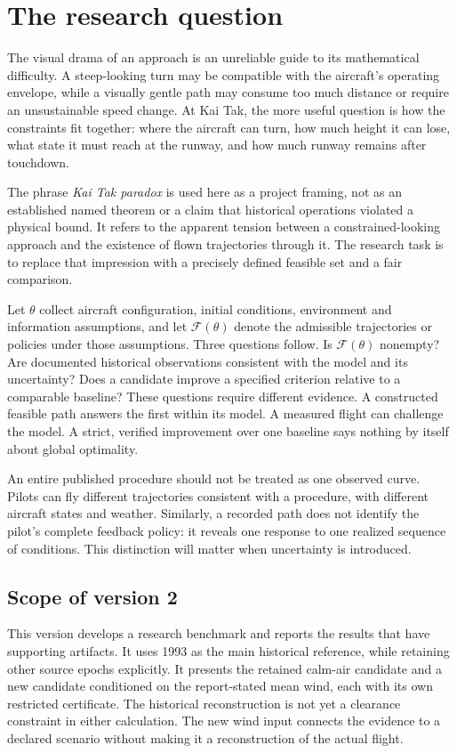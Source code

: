 \section{The research question}
\label{sec:question}
The visual drama of an approach is an unreliable guide to its mathematical difficulty. A steep-looking turn may be compatible with the aircraft's operating envelope, while a visually gentle path may consume too much distance or require an unsustainable speed change. At Kai Tak, the more useful question is how the constraints fit together: where the aircraft can turn, how much height it can lose, what state it must reach at the runway, and how much runway remains after touchdown.

The phrase \emph{Kai Tak paradox} is used here as a project framing, not as an established named theorem or a claim that historical operations violated a physical bound. It refers to the apparent tension between a constrained-looking approach and the existence of flown trajectories through it. The research task is to replace that impression with a precisely defined feasible set and a fair comparison.

Let $\theta$ collect aircraft configuration, initial conditions, environment and information assumptions, and let $\mathcal F(\theta)$ denote the admissible trajectories or policies under those assumptions. Three questions follow. Is $\mathcal F(\theta)$ nonempty? Are documented historical observations consistent with the model and its uncertainty? Does a candidate improve a specified criterion relative to a comparable baseline? These questions require different evidence. A constructed feasible path answers the first within its model. A measured flight can challenge the model. A strict, verified improvement over one baseline says nothing by itself about global optimality.

An entire published procedure should not be treated as one observed curve. Pilots can fly different trajectories consistent with a procedure, with different aircraft states and weather. Similarly, a recorded path does not identify the pilot's complete feedback policy: it reveals one response to one realized sequence of conditions. This distinction will matter when uncertainty is introduced.

\subsection{Scope of version 2}
This version develops a research benchmark and reports the results that have supporting artifacts. It uses 1993 as the main historical reference, while retaining other source epochs explicitly. It presents the retained calm-air candidate and a new candidate conditioned on the report-stated mean wind, each with its own restricted certificate. The historical reconstruction is not yet a clearance constraint in either calculation. The new wind input connects the evidence to a declared scenario without making it a reconstruction of the actual flight.

